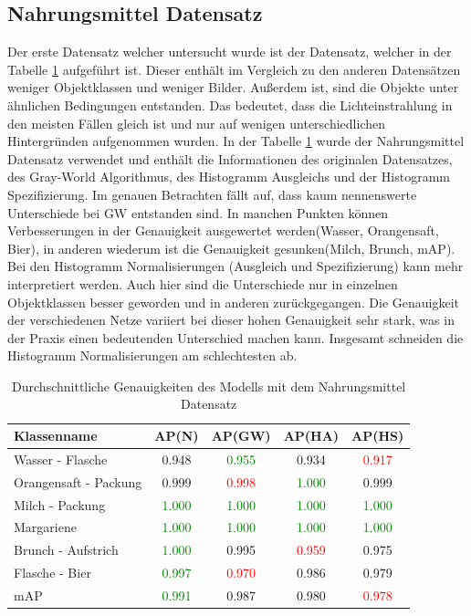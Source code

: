 \documentclass[a4paper,12pt,oneside]{article}
\begin{document}
  \subsection{Nahrungsmittel Datensatz}
Der erste Datensatz welcher untersucht wurde ist der Datensatz, welcher in der Tabelle \ref{tab:nahrungsmitteltest} aufgeführt ist. Dieser enthält im Vergleich zu den anderen Datensätzen weniger Objektklassen und weniger Bilder. Außerdem ist, sind die Objekte unter ähnlichen Bedingungen entstanden. Das bedeutet, dass die Lichteinstrahlung in den meisten Fällen gleich ist und nur auf wenigen unterschiedlichen Hintergründen aufgenommen wurden. In der Tabelle \ref{tab:nahrungsmitteltest} wurde der Nahrungsmittel Datensatz verwendet und enthält die Informationen des originalen Datensatzes, des Gray-World Algorithmus, des Histogramm Ausgleichs und der Histogramm Spezifizierung. Im genauen Betrachten fällt auf, dass kaum nennenswerte Unterschiede bei GW entstanden sind. In manchen Punkten können Verbesserungen in der Genauigkeit ausgewertet werden(Wasser, Orangensaft, Bier), in anderen wiederum ist die Genauigkeit gesunken(Milch, Brunch, mAP).\\
Bei den Histogramm Normalisierungen (Ausgleich und Spezifizierung) kann mehr interpretiert werden. Auch hier sind die Unterschiede nur in einzelnen Objektklassen besser geworden und in anderen zurückgegangen. Die Genauigkeit der verschiedenen Netze variiert bei dieser hohen Genauigkeit sehr stark, was in der Praxis einen bedeutenden Unterschied machen kann. Insgesamt schneiden die Histogramm Normalisierungen am schlechtesten ab.
\begin{table}
[h]
\caption{Durchschnittliche Genauigkeiten des Modells mit dem Nahrungsmittel Datensatz}
\centering
\begin{tabular}{|l|c|c|c|c|}
\hline
Klassenname & AP(N) & AP(GW) & AP(HA) & AP(HS)\\
\hline
Wasser - Flasche & 0.948 & \textcolor{green}{0.955} & 0.934 & \textcolor{red}{0.917}\\
Orangensaft - Packung & 0.999 & \textcolor{red}{0.998} & \textcolor{green}{1.000} & 0.999\\
Milch - Packung & \textcolor{green}{1.000} & \textcolor{green}{1.000} & \textcolor{green}{1.000} & \textcolor{green}{1.000}\\
Margariene & \textcolor{green}{1.000} & \textcolor{green}{1.000} & \textcolor{green}{1.000} & \textcolor{green}{1.000}\\
Brunch - Aufstrich & \textcolor{green}{1.000} & 0.995 & \textcolor{red}{0.959} & 0.975\\
Flasche - Bier & \textcolor{green}{0.997} & \textcolor{red}{0.970} & 0.986 & 0.979\\
\hline
mAP & \textcolor{green}{0.991} & 0.987 & 0.980 & \textcolor{red}{0.978}\\
\hline
\end{tabular}
\label{tab:nahrungsmitteltest}
\end{table}
\end{document}
